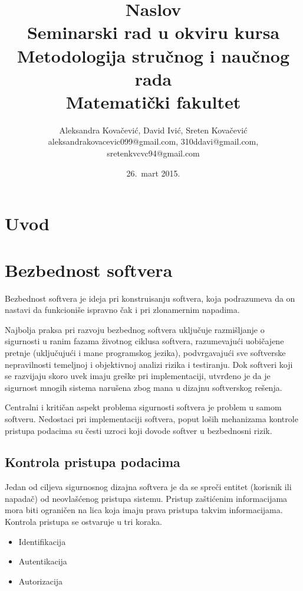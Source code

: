 \documentclass[a4paper]{article}
\begin{document}
\title{Naslov\\ \small{Seminarski rad u okviru kursa\\Metodologija stručnog i naučnog rada\\ Matematički fakultet}}

\author{Aleksandra Kovačević, David Ivić, Sreten Kovačević\\ aleksandrakovacevic099@gmail.com, 310ddavi@gmail.com,\\ sretenkvcvc94@gmail.com}
\date{26.~mart 2015.}
\maketitle

\abstract{
}

\tableofcontents

\newpage

\section{Uvod}

\section{Bezbednost softvera}

Bezbednost softvera je ideja pri konstruisanju softvera, koja podrazumeva da on nastavi da funkcioniše ispravno čak i pri zlonamernim napadima.

Najbolja praksa pri razvoju bezbednog softvera uključuje razmišljanje o sigurnosti u ranim fazama životnog ciklusa softvera, razumevajući uobičajene pretnje (uključujući i mane programskog jezika), podvrgavajući sve softverske nepravilnosti temeljnoj i objektivnoj analizi rizika i testiranju. Dok softveri koji se razvijaju skoro uvek imaju greške pri implementaciji, utvrđeno je da je sigurnost mnogih sistema narušena zbog mana u dizajnu softverskog rešenja.

Centralni i kritičan aspekt problema sigurnosti softvera je problem u samom softveru. Nedostaci pri implementaciji softvera, poput loših mehanizama kontrole pristupa podacima su česti uzroci koji dovode softver u bezbednosni rizik. 

\subsection{Kontrola pristupa podacima}
Jedan od ciljeva sigurnosnog dizajna softvera je da se spreči entitet (korisnik ili napadač) od neovlašćenog pristupa sistemu. Pristup zaštićenim informacijama mora biti ograničen na lica koja imaju prava pristupa takvim informacijama.
Kontrola pristupa se ostvaruje u tri koraka.
\begin{itemize}
                    \item Identifikacija
                    \item Autentikacija
                    \item Autorizacija
\end{itemize} 
\end{document}
